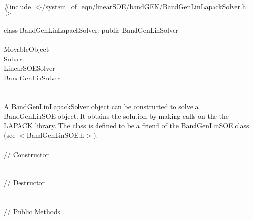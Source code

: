 
   \\
\indent \#include $<\tilde{ }$/system\_of\_eqn/linearSOE/bandGEN/BandGenLinLapackSolver.h$>$  \\

  \\
\indent class BandGenLinLapackSolver: public BandGenLinSolver  \\

 \\
\indent MovableObject \\
\indent\indent  Solver \\
\indent\indent\indent LinearSOESolver \\
\indent\indent\indent\indent BandGenLinSolver \\
\indent\indent\indent\indent{} \\

  \\
\indent A BandGenLinLapackSolver object can be constructed to solve
a BandGenLinSOE object. It obtains the solution by making calls on the
the LAPACK library. The class is defined to be a friend of the 
BandGenLinSOE class (see $<$BandGenLinSOE.h$>$). \\


  \\
\indent\indent // Constructor \\
\indent{}  \\ \\
\indent\indent // Destructor \\
\indent{}\\  \\
\indent\indent // Public Methods \\
\indent{} \\
\indent{} \\
\indent{} \\ 
\indent{} \\ 


